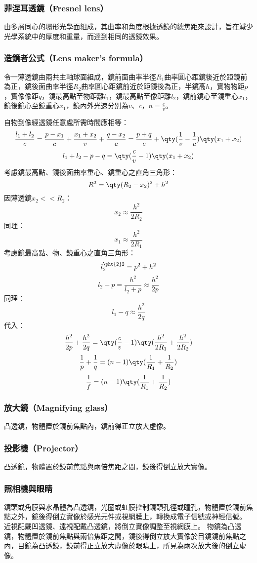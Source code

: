 \documentclass[a4paper,12pt]{report}
\begin{document}
\subsubsection{菲涅耳透鏡（Fresnel lens）}
由多層同心的環形光學面組成，其曲率和角度根據透鏡的總焦距來設計，旨在減少光學系統中的厚度和重量，而達到相同的透鏡效果。
\subsubsection{造鏡者公式（Lens maker's formula）}
令一薄透鏡由兩共主軸球面組成，鏡前面曲率半徑$R_1$曲率圓心距鏡後近於距鏡前為正，鏡後面曲率半徑$R_2$曲率圓心距鏡前近於距鏡後為正，半鏡高$h$，實物物距$p$，實像像距$q$，鏡最高點至物距離$l_1$，鏡最高點至像距離$l_2$，鏡前鏡心至鏡重心$x_1$，鏡後鏡心至鏡重心$x_1$，鏡內外光速分別為$v$、$c$，$n=\frac{c}{v}$。

自物到像經透鏡任意處所需時間應相等：
\[\frac{l_1+l_2}{c}=\frac{p-x_1}{c}+\frac{x_1+x_2}{v}+\frac{q-x_2}{c}=\frac{p+q}{c}+\qty(\frac{1}{v}-\frac{1}{c})\qty(x_1+x_2)\]
\[l_1+l_2-p-q=\qty(\frac{c}{v}-1)\qty(x_1+x_2)\]
考慮鏡最高點、鏡後面曲率重心、鏡重心之直角三角形：
\[R^2=\qty(R_2-x_2)^2+h^2\]
因薄透鏡$x_2<<R_2$：
\[x_2\approx\frac{h^2}{2R_2}\]
同理：
\[x_1\approx\frac{h^2}{2R_1}\]
考慮鏡最高點、物、鏡重心之直角三角形：
\[l_2^{\pht{2}2}=p^2+h^2\]
\[l_2-p=\frac{h^2}{l_2+p}\approx\frac{h^2}{2p}\]
同理：
\[l_1-q\approx\frac{h^2}{2q}\]
代入：
\[\frac{h^2}{2p}+\frac{h^2}{2q}=\qty(\frac{c}{v}-1)\qty(\frac{h^2}{2R_1}+\frac{h^2}{2R_2})\]
\[\frac{1}{p}+\frac{1}{q}=(n-1)\qty(\frac{1}{R_1}+\frac{1}{R_2})\]
\[\frac{1}{f}=(n-1)\qty(\frac{1}{R_1}+\frac{1}{R_2})\]
\subsubsection{放大鏡（Magnifying glass）}
凸透鏡，物體置於鏡前焦點內，鏡前得正立放大虛像。
\subsubsection{投影機（Projector）}
凸透鏡，物體置於鏡前焦點與兩倍焦距之間，鏡後得倒立放大實像。
\subsubsection{照相機與眼睛}
鏡頭或角膜與水晶體為凸透鏡，光圈或虹膜控制鏡頭孔徑或瞳孔，物體置於鏡前焦點之外，鏡後得倒立實像於感光元件或視網膜上，轉換成電子信號或神經信號。
近視配戴凹透鏡、遠視配戴凸透鏡，將倒立實像調整至視網膜上。
物鏡為凸透鏡，物體置於鏡前焦點與兩倍焦距之間，鏡後得倒立放大實像於目鏡鏡前焦點之內，目鏡為凸透鏡，鏡前得正立放大虛像於眼睛上，所見為兩次放大後的倒立虛像。
\end{document}
